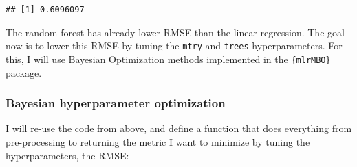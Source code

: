 \documentclass[]{gitbook}
\newenvironment{Shaded}{\begin{snugshade}}{\end{snugshade}}
\newcommand{\ControlFlowTok}[1]{\textcolor[rgb]{0.13,0.29,0.53}{\textbf{#1}}}
\newcommand{\DataTypeTok}[1]{\textcolor[rgb]{0.13,0.29,0.53}{#1}}
\newcommand{\DecValTok}[1]{\textcolor[rgb]{0.00,0.00,0.81}{#1}}
\newcommand{\KeywordTok}[1]{\textcolor[rgb]{0.13,0.29,0.53}{\textbf{#1}}}
\newcommand{\NormalTok}[1]{#1}
\newcommand{\OperatorTok}[1]{\textcolor[rgb]{0.81,0.36,0.00}{\textbf{#1}}}
\newcommand{\StringTok}[1]{\textcolor[rgb]{0.31,0.60,0.02}{#1}}
\begin{document}
\begin{verbatim}
## [1] 0.6096097
\end{verbatim}

The random forest has already lower RMSE than the linear regression. The goal now is to lower this
RMSE by tuning the \texttt{mtry} and \texttt{trees} hyperparameters. For this, I will use Bayesian Optimization
methods implemented in the \texttt{\{mlrMBO\}} package.

\hypertarget{bayesian-hyperparameter-optimization}{%
\subsubsection{Bayesian hyperparameter optimization}\label{bayesian-hyperparameter-optimization}}

I will re-use the code from above, and define a function that does everything from pre-processing
to returning the metric I want to minimize by tuning the hyperparameters, the RMSE:

\begin{Shaded}
\end{Shaded}
\end{document}
